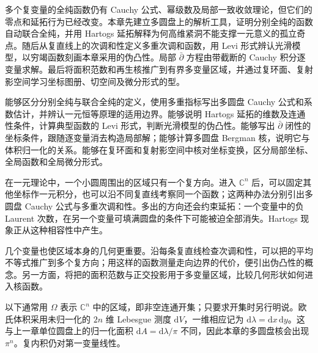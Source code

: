 
\begin{chapterabstract}
多个复变量的全纯函数仍有 Cauchy 公式、幂级数及局部一致收敛理论，但它们的零点和延拓行为已经改变。本章先建立多圆盘上的解析工具，证明分别全纯的函数自动联合全纯，并用 Hartogs 延拓解释为何高维紧洞不能支撑一元意义的孤立奇点。随后从复直线上的次调和性定义多重次调和函数，用 Levi 形式辨认光滑模型，以穷竭函数刻画本章采用的伪凸性。局部 \(\bar\partial\) 方程由带截断的 Cauchy 积分逐变量求解。最后将面积范数和再生核推广到有界多变量区域，并通过复环面、复射影空间学习坐标图册、切空间及微分形式的型。
\end{chapterabstract}

\begin{learninggoals}
能够区分分别全纯与联合全纯的定义，使用多重指标写出多圆盘 Cauchy 公式和系数估计，并辨认一元恒等原理的适用边界。能够说明 Hartogs 延拓的维数及连通性条件，计算典型函数的 Levi 形式，判断光滑模型的伪凸性。能够写出 \(\bar\partial\) 闭性的坐标条件，跟随逐变量消去构造局部解；能够计算多圆盘 Bergman 核，说明它与体积归一化的关系。能够在复环面和复射影空间中核对坐标变换，区分局部坐标、全局函数和全局微分形式。
\end{learninggoals}

在一元理论中，一个小圆周围出的区域只有一个复方向。进入 \(\mathbb C^n\) 后，可以固定其他坐标作一元积分，也可以沿不同复直线考察同一个函数；这两种办法分别引出多圆盘 Cauchy 公式与多重次调和性。多出的方向还会约束延拓：一个变量中的负 Laurent 次数，在另一个变量可填满圆盘的条件下可能被迫全部消失。Hartogs 现象正从这种相容性中产生。

\ProseParagraphBreak

几个变量也使区域本身的几何更重要。沿每条复直线检查次调和性，可以把的平均不等式推广到多个复方向；用这样的函数测量走向边界的代价，便引出伪凸性的概念。另一方面，将把的面积范数与正交投影用于多变量区域，比较几何形状如何进入核函数。

\ProseParagraphBreak

以下通常用 \(\Omega\) 表示 \(\mathbb C^n\) 中的区域，即非空连通开集；只要求开集时另行明说。欧氏体积采用未归一化的 \(2n\) 维 Lebesgue 测度 \(\mathrm dV\)，一维相应记为 \(\mathrm d\lambda=\mathrm dx\,\mathrm dy\)。这与上一章单位圆盘上的归一化面积 \(\mathrm dA=\mathrm d\lambda/\pi\) 不同，因此本章的多圆盘核会出现 \(\pi^n\)。复内积仍对第一变量线性。

